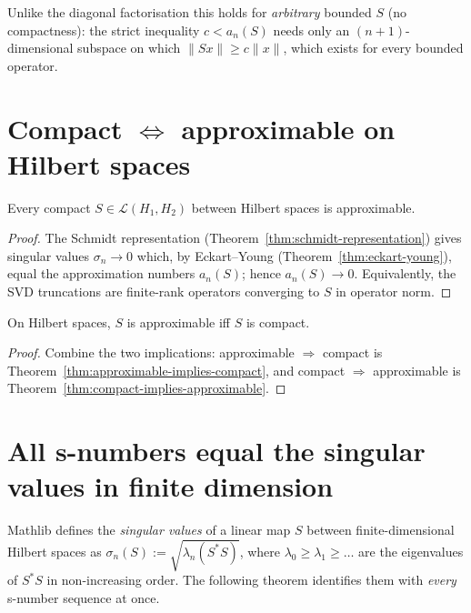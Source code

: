 Unlike the diagonal factorisation this holds for \emph{arbitrary} bounded
$S$ (no compactness): the strict inequality $c < a_n(S)$ needs only an
$(n+1)$-dimensional subspace on which $\|S x\| \ge c\|x\|$, which exists for
every bounded operator.

\section{Compact $\Leftrightarrow$ approximable on Hilbert spaces}
\label{sec:svd-compact-equiv}

\begin{theorem}
\label{thm:compact-implies-approximable}
\leanok
{}
Every compact $S \in \mathcal{L}(H_1, H_2)$ between Hilbert spaces is
approximable.
\end{theorem}
\begin{proof}
\leanok
{}
The Schmidt representation (Theorem~\ref{thm:schmidt-representation}) gives
singular values $\sigma_n \to 0$ which, by Eckart--Young
(Theorem~\ref{thm:eckart-young}), equal the approximation numbers $a_n(S)$;
hence $a_n(S) \to 0$. Equivalently, the SVD truncations are finite-rank
operators converging to $S$ in operator norm.
\end{proof}

\begin{theorem}
\label{thm:compact-iff-approximable}
\leanok
On Hilbert spaces, $S$ is approximable iff $S$ is compact.
\end{theorem}
\begin{proof}
\leanok
{}
Combine the two implications: approximable $\Rightarrow$ compact is
Theorem~\ref{thm:approximable-implies-compact}, and compact $\Rightarrow$
approximable is Theorem~\ref{thm:compact-implies-approximable}.
\end{proof}

\section{All s-numbers equal the singular values in finite dimension}
\label{sec:svd-findim}

Mathlib defines the \emph{singular values} of a linear map $S$ between
finite-dimensional Hilbert spaces as
$\sigma_n(S) := \sqrt{\lambda_n(S^* S)}$, where $\lambda_0 \ge \lambda_1
\ge \dots$ are the eigenvalues of $S^* S$ in non-increasing order. The
following theorem identifies them with \emph{every} s-number sequence at
once.

